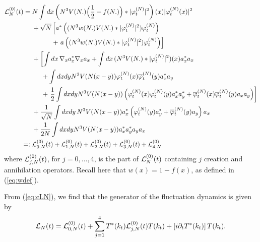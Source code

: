 \documentclass[11pt,a4paper]{article}
\newcommand{\done}{}
\newcommand{\cL}{{\cal L}}
\newcommand{\di}{{d}}		%
\newcommand{\ph}{\varphi_t^{(N)}}	%
\begin{document}
\[ \begin{split} \cL_N^{(0)} (t) = \; & %
N \int \di x\left( N^3 V(N.)\Big(\frac{1}{2}-f(N.)\Big)\ast \lvert \ph\rvert^2 \right)(x) \lvert \ph(x)\rvert^2 \done\\
&+ \sqrt{N}  \left[  a^*\left( (N^3
w(N.) V (N.) *| \varphi_t^{(N)}|^2) \varphi_t^{(N)} \right) \right. \\
& \quad \qquad + \left. a\left( (N^3 w (N.)V (N.) *| \varphi_t^{(N)}|^2) \varphi_t^{(N)} \right) \right] \\
&+ \left[ \int dx \, \nabla_x a_x^* \nabla_x a_x + \int dx \, (N^3 V (N.) * |\varphi_t^{(N)}|^2) (x) a_x^* a_x \right. \\ 
&\hspace{.5cm}+ \int dx dy N^3 V(N (x-y)) \varphi_t^{(N)} (x) \overline{\varphi}_t^{(N)} (y) a_x^* a_y \\
&\hspace{.5cm}+ \left.  \frac{1}{2} \int dx dy N^3 V(N (x-y)) \left( \varphi_t^{(N)} (x) \varphi_t^{(N)} (y) a_x^* a_y^* + 
\overline{\varphi}_t^{(N)} (x) \overline{\varphi}_t^{(N)} (y) a_x a_y \right) \right] \\
&+ \frac{1}{\sqrt{N}}  \int dx dy \, N^3 V(N(x-y)) a_x^* \left( \varphi_t^{(N)} (y) a_y^* + \overline{\varphi}_t^{(N)} (y) a_y \right) a_x \\
&+\frac{1}{2N} \int dx dy N^3 V(N (x-y)) a_x^* a_y^* a_y a_x \\
=: \; & \cL_{0,N}^{(0)} (t) + \cL_{1,N}^{(0)} (t) + \cL_{2,N}^{(0)} (t) +  
\cL_{3,N}^{(0)} (t) + \cL_{4,N}^{(0)} 
\end{split} \]
where $\cL^{(0)}_{j,N} (t)$, for $j=0, \dots , 4$, is the part of $\cL_N^{(0)} (t)$ containing $j$ creation and annihilation operators. Recall here that $w (x) = 1 - f (x)$, as defined in (\ref{eq:wdef}). 

{F}rom (\ref{eq:cLN}), we find that the generator of the fluctuation dynamics is given by
\begin{equation}\label{eq:dec-cLN} \cL_N (t) =  \cL_{0,N}^{(0)} (t) +
\sum_{j=1}^4 T^* (k_t) \cL_{j,N}^{(0)} (t) T (k_t) +\left[ i \partial_t T^*
(k_t) \right] T(k_t). \end{equation}
\end{document}
